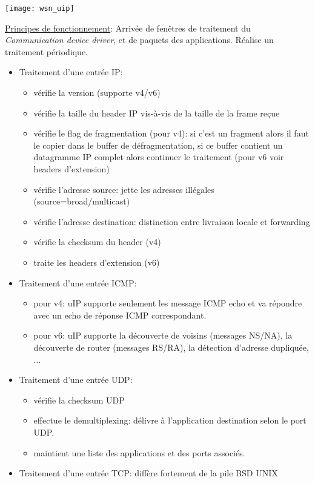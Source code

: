 \documentclass{article}
\begin{document}
\begin{sffamily}
\texttt{[image: wsn\_uip]}

\underline{Principes de fonctionnement}:
Arrivée de fenêtres de traitement du \textit{Communication device driver}, et
de paquets des applications. Réalise un traitement périodique.
\begin{itemize}
\item Traitement d'une entrée IP:
  \begin{itemize}
  \item vérifie la version (supporte v4/v6)
  \item vérifie la taille du header IP vis-à-vis de la taille de la frame reçue
  \item vérifie le flag de fragmentation (pour v4): si c'est un fragment
    alors il faut le copier dans le buffer de défragmentation, si ce buffer
    contient un datagramme IP complet alors continuer le traitement
    (pour v6 voir headers d'extension)
  \item vérifie l'adresse source: jette les adresses illégales
    (source=broad/multicast)
  \item vérifie l'adresse destination: distinction entre livraison locale et
    forwarding
  \item vérifie la checksum du header (v4)
  \item traite les headers d'extension (v6)
  \end{itemize}
\item Traitement d'une entrée ICMP:
  \begin{itemize}
  \item pour v4: uIP supporte seulement les message ICMP echo et va répondre
    avec un echo de réponse ICMP correspondant.
  \item pour v6: uIP supporte la découverte de voisins (messages NS/NA),
    la découverte de router (messages RS/RA), la détection d'adresse dupliquée,
    ...
  \end{itemize}
\item Traitement d'une entrée UDP:
  \begin{itemize}
  \item vérifie la checksum UDP
  \item effectue le demultiplexing: délivre à l'application destination
    selon le port UDP.
  \item maintient une liste des applications et des ports associés.
  \end{itemize}
\item Traitement d'une entrée TCP: diffère fortement de la pile BSD UNIX
  \begin{itemize}

\end{itemize}
\end{itemize}
\end{sffamily}
\end{document}

